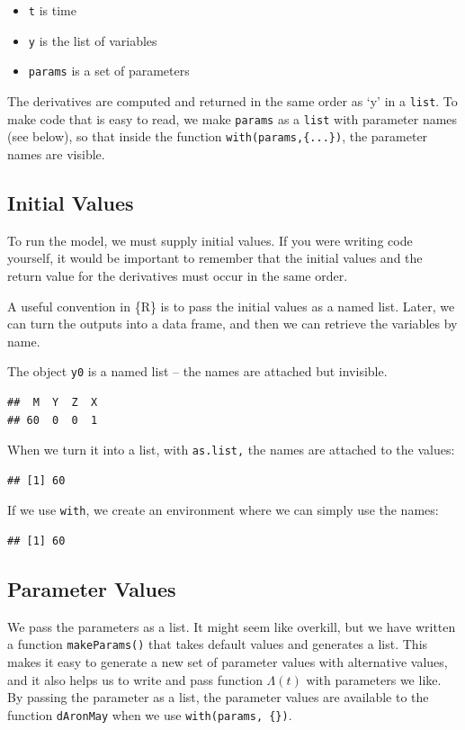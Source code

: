 \documentclass[
]{book}
\begin{document}
\begin{itemize}
\item
  \texttt{t} is time
\item
  \texttt{y} is the list of variables
\item
  \texttt{params} is a set of parameters
\end{itemize}

The derivatives are computed and returned in the same order as `y' in a \texttt{list}. To make code that is easy to read, we make \texttt{params} as a \texttt{list} with parameter names (see below), so that inside the function \texttt{with(params,\{...\})}, the parameter names are visible.

\subsection{Initial Values}\label{initial-values}

To run the model, we must supply initial values. If you were writing code yourself, it would be important to remember that the initial values and the return value for the derivatives must occur in the same order.

A useful convention in \{R\} is to pass the initial values as a named list. Later, we can turn the outputs into a data frame, and then we can retrieve the variables by name.

The object \texttt{y0} is a named list -- the names are attached but invisible.

\begin{verbatim}
##  M  Y  Z  X 
## 60  0  0  1
\end{verbatim}

When we turn it into a list, with \texttt{as.list,} the names are attached to the values:

\begin{verbatim}
## [1] 60
\end{verbatim}

If we use \texttt{with}, we create an environment where we can simply use the names:

\begin{verbatim}
## [1] 60
\end{verbatim}

\subsection{Parameter Values}\label{parameter-values}

We pass the parameters as a list. It might seem like overkill, but we have written a function \texttt{makeParams()} that takes default values and generates a list. This makes it easy to generate a new set of parameter values with alternative values, and it also helps us to write and pass function \(\Lambda(t)\) with parameters we like. By passing the parameter as a list, the parameter values are available to the function \texttt{dAronMay} when we use \texttt{with(params,\ \{\})}.
\end{document}
